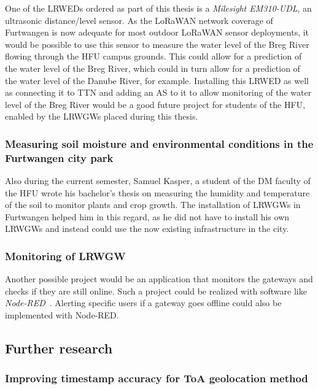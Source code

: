 One of the \aclp{LRWED} ordered as part of this thesis is a \emph{Milesight EM310-UDL}, an ultrasonic distance/level sensor.
As the \ac{LoRaWAN} network coverage of Furtwangen is now adequate for most outdoor \ac{LoRaWAN} sensor deployments, it would be possible to use this sensor to measure the water level of the Breg River flowing through the \ac{HFU} campus grounds.
This could allow for a prediction of the water level of the Breg River, which could in turn allow for a prediction of the water level of the Danube River, for example.
Installing this \acl{LRWED} as well as connecting it to \ac{TTN} and adding an \acf{AS} to it to allow monitoring of the water level of the Breg River would be a good future project for students of the \ac{HFU}, enabled by the \aclp{LRWGW} placed during this thesis.

\subsubsection{Measuring soil moisture and environmental conditions in the Furtwangen city park}

Also during the current semester, Samuel Kasper, a student of the \ac{DM} faculty of the \ac{HFU} wrote his bachelor's thesis on measuring the humidity and temperature of the soil to monitor plants and crop growth.
The installation of \aclp{LRWGW} in Furtwangen helped him in this regard, as he did not have to install his own \aclp{LRWGW} and instead could use the now existing infrastructure in the city.

\subsubsection{Monitoring of \acl{LRWGW}}

Another possible project would be an application that monitors the gateways and checks if they are still online.
Such a project could be realized with software like \emph{Node-RED}~\cite{openjs_foundation_node-red_nodate}.
Alerting specific users if a gateway goes offline could also be implemented with Node-RED.

\subsection{Further research}

\subsubsection{Improving timestamp accuracy for \acl{ToA} geolocation method}

